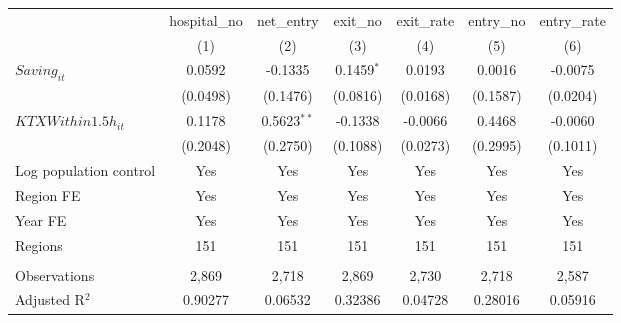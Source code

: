 \begingroup
\centering
\begin{tabular}{lcccccc}
   \toprule
                          & hospital\_no  & net\_entry    & exit\_no     & exit\_rate  & entry\_no  & entry\_rate \\    
                          & (1)           & (2)           & (3)          & (4)         & (5)        & (6)\\  
   \midrule 
   $Saving_{it}$          & 0.0592        & -0.1335       & 0.1459$^{*}$ & 0.0193      & 0.0016     & -0.0075\\   
                          & (0.0498)      & (0.1476)      & (0.0816)     & (0.0168)    & (0.1587)   & (0.0204)\\   
   $KTXWithin1.5h_{it}$   & 0.1178        & 0.5623$^{**}$ & -0.1338      & -0.0066     & 0.4468     & -0.0060\\   
                          & (0.2048)      & (0.2750)      & (0.1088)     & (0.0273)    & (0.2995)   & (0.1011)\\   
   Log population control & Yes           & Yes           & Yes          & Yes         & Yes        & Yes\\  
   Region FE              & Yes           & Yes           & Yes          & Yes         & Yes        & Yes\\  
   Year FE                & Yes           & Yes           & Yes          & Yes         & Yes        & Yes\\  
   Regions                & 151           & 151           & 151          & 151         & 151        & 151\\  
    \\
   Observations           & 2,869         & 2,718         & 2,869        & 2,730       & 2,718      & 2,587\\  
   Adjusted R$^2$         & 0.90277       & 0.06532       & 0.32386      & 0.04728     & 0.28016    & 0.05916\\  
   \bottomrule
\end{tabular}
\par\endgroup
